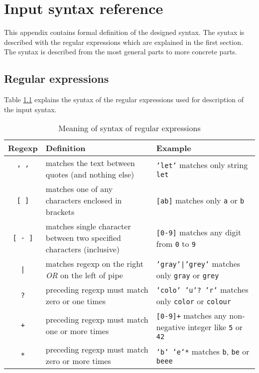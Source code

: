 
\chapter{Input syntax reference}
\label{chap:syntax}

This appendix contains formal definition of the designed syntax.
The syntax is described with the regular expressions which are explained in the first section.
The syntax is described from the most general parts to more concrete parts.

\section{Regular expressions}
\label{sec:regexps}

Table \ref{tbl:regexpExplanation} explains the syntax of the regular expressions used for description of the input syntax.

\begin{table}[ht]
	\centering
	\begin{tabular}{c p{160pt} p{170pt}}
   		\toprule
   		Regexp & Definition & Example \\
   		\midrule
		\texttt{' '} & matches the text between quotes (and nothing else) & \texttt{'let'} matches only string \texttt{let} \\ \hline
		\texttt{[ ]} & matches one of any characters enclosed in brackets & \texttt{[ab]} matches only \texttt{a} or \texttt{b} \\ \hline
		\texttt{[ - ]} & matches single character between two specified characters (inclusive) & \texttt{[0-9]} matches any digit from \texttt{0} to \texttt{9} \\ \hline
		\texttt{|} & matches regexp on the right \emph{OR} on the left of pipe & \texttt{'gray'|'grey'} matches only \texttt{gray} or \texttt{grey} \\ \hline
		\texttt{?} & preceding regexp must match zero or one times & \texttt{'colo' 'u'? 'r'} matches only \texttt{color} or \texttt{colour} \\ \hline
		\texttt{+} & preceding regexp must match one or more times & \texttt{[0-9]+} matches any non-negative integer like \texttt{5} or \texttt{42} \\ \hline
		\texttt{*} & preceding regexp must match zero or more times & \texttt{'b' 'e'*} matches \texttt{b}, \texttt{be} or \texttt{beee} \\
		\bottomrule
	\end{tabular}
	\caption{Meaning of syntax of regular expressions}
	\label{tbl:regexpExplanation}
\end{table}


